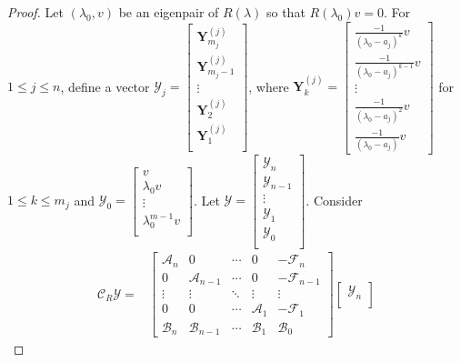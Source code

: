 \documentclass[12pt, reqno]{amsart}
\theoremstyle{definition}
\theoremstyle{remark}
\numberwithin{equation}{section}
\begin{document}
\begin{proof}
Let $(\lambda_0,v)$ be an eigenpair of $R(\lambda)$ so that 
$R(\lambda_0)v = 0$.  
For $1 \leq j \leq n$, define a vector $\mathcal{Y}_j=\begin{bmatrix}
\textbf{Y}_{m_j}^{(j)} \\
\textbf{Y}_{m_j -1}^{(j)} \\
\vdots \\
\textbf{Y}_{2}^{(j)} \\
\textbf{Y}_{1}^{(j)}\\
\end{bmatrix}$, where $\textbf{Y}_k^{(j)} = \displaystyle \begin{bmatrix}
\frac{-1}{(\lambda_0-a_j)^k} v\\
\frac{-1}{(\lambda_0-a_j)^{k-1}} v\\
\vdots\\
\frac{-1}{(\lambda_0-a_j)^2}v\\
\frac{-1}{(\lambda_0-a_j)}v
\end{bmatrix}$ for $1 \leq k \leq m_j$ and $\mathcal{Y}_0 = \begin{bmatrix}
v\\
\lambda_0v\\
\vdots\\
\lambda_0^{m-1}v\\
\end{bmatrix}$. Let $\mathcal{Y} =\begin{bmatrix}
\mathcal{Y}_n \\
\mathcal{Y}_{n-1} \\
\vdots \\
\mathcal{Y}_1 \\
\mathcal{Y}_0\\
\end{bmatrix}$. Consider 
\begin{align*}
\mathcal{C}_R \mathcal{Y} = &\begin{bmatrix}
\mathcal{A}_n & 0 & \cdots & 0 & -\mathcal{F}_n \\
0 & \mathcal{A}_{n-1} & \cdots & 0 & -\mathcal{F}_{n-1} \\
\vdots & \vdots & \ddots & \vdots & \vdots \\
0 & 0 & \cdots & \mathcal{A}_1 & -\mathcal{F}_1 \\
\mathcal{B}_n & \mathcal{B}_{n-1} & \cdots & \mathcal{B}_1 & \mathcal{B}_0
\end{bmatrix} \begin{bmatrix}
\mathcal{Y}_n \\

\end{bmatrix}
\end{align*}
\end{proof}
\end{document}
